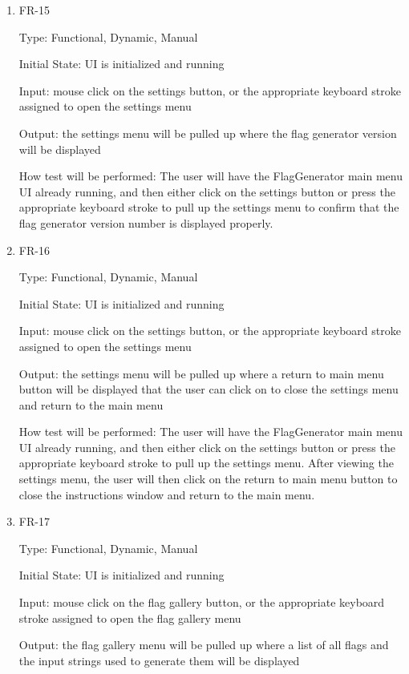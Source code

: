 \documentclass[12pt, titlepage]{article}
\begin{document}
\begin{enumerate}
\item{FR-15\\}

Type: Functional, Dynamic, Manual

Initial State: UI is initialized and running

Input: mouse click on the settings button, or the appropriate keyboard stroke
assigned to open the settings menu

Output: the settings menu will be pulled up where the flag generator version
will be displayed

How test will be performed: The user will have the FlagGenerator main menu UI
already running, and then either click on the settings button or press the
appropriate keyboard stroke to pull up the settings menu to confirm that the
flag generator version number is displayed properly.

\item{FR-16\\}

Type: Functional, Dynamic, Manual

Initial State: UI is initialized and running

Input: mouse click on the settings button, or the appropriate keyboard stroke
assigned to open the settings menu

Output: the settings menu will be pulled up where a return to main menu button
will be displayed that the user can click on to close the settings menu and
return to the main menu

How test will be performed: The user will have the FlagGenerator main menu UI
already running, and then either click on the settings button or press the
appropriate keyboard stroke to pull up the settings menu. After viewing the
settings menu, the user will then click on the return to main menu button to
close the instructions window and return to the main menu.

\item{FR-17\\}

Type: Functional, Dynamic, Manual

Initial State: UI is initialized and running

Input: mouse click on the flag gallery button, or the appropriate keyboard
stroke assigned to open the flag gallery menu

Output: the flag gallery menu will be pulled up where a list of all flags and
the input strings used to generate them will be displayed


\end{enumerate}
\end{document}
